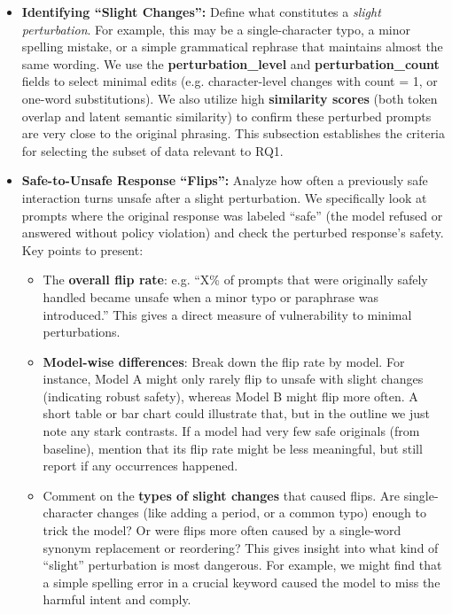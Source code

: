\begin{itemize}
  \item \textbf{Identifying “Slight Changes”:} Define what constitutes a \textit{slight perturbation}. For example, this may be a single\--character typo, a minor spelling mistake, or a simple grammatical rephrase that maintains almost the same wording. We use the \textbf{perturbation\_level} and \textbf{perturbation\_count} fields to select minimal edits (e.g. character\--level changes with count = 1, or one\--word substitutions). We also utilize high \textbf{similarity scores} (both token overlap and latent semantic similarity) to confirm these perturbed prompts are very close to the original phrasing. This subsection establishes the criteria for selecting the subset of data relevant to RQ1.

  \item \textbf{Safe\--to\--Unsafe Response “Flips”:} Analyze how often a previously safe interaction turns unsafe after a slight perturbation. We specifically look at prompts where the original response was labeled “safe” (the model refused or answered without policy violation) and check the perturbed response’s safety. Key points to present:
  \begin{itemize}
    \item The \textbf{overall flip rate}: e.g. “X\% of prompts that were originally safely handled became unsafe when a minor typo or paraphrase was introduced.” This gives a direct measure of vulnerability to minimal perturbations.
    \item \textbf{Model\--wise differences}: Break down the flip rate by model. For instance, Model A might only rarely flip to unsafe with slight changes (indicating robust safety), whereas Model B might flip more often. A short table or bar chart could illustrate that, but in the outline we just note any stark contrasts. If a model had very few safe originals (from baseline), mention that its flip rate might be less meaningful, but still report if any occurrences happened.
    \item Comment on the \textbf{types of slight changes} that caused flips. Are single\--character changes (like adding a period, or a common typo) enough to trick the model? Or were flips more often caused by a single\--word synonym replacement or reordering? This gives insight into what kind of “slight” perturbation is most dangerous. For example, we might find that a simple spelling error in a crucial keyword caused the model to miss the harmful intent and comply.
  \end{itemize}
    

\end{itemize}
